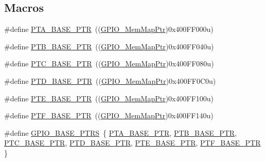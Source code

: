 \subsection*{Macros}
\begin{DoxyCompactItemize}
\item 
\#define \hyperlink{group___g_p_i_o___peripheral_gadf98f6ee2bbfd42102e378a66b29b9ef}{P\+T\+A\+\_\+\+B\+A\+S\+E\+\_\+\+P\+T\+R}~((\hyperlink{group___g_p_i_o___peripheral_ga31c1eddda45aa085f51142987e05ada5}{G\+P\+I\+O\+\_\+\+Mem\+Map\+Ptr})0x400\+F\+F000u)
\item 
\#define \hyperlink{group___g_p_i_o___peripheral_ga59ab0f28e891ea28f152505ce2021747}{P\+T\+B\+\_\+\+B\+A\+S\+E\+\_\+\+P\+T\+R}~((\hyperlink{group___g_p_i_o___peripheral_ga31c1eddda45aa085f51142987e05ada5}{G\+P\+I\+O\+\_\+\+Mem\+Map\+Ptr})0x400\+F\+F040u)
\item 
\#define \hyperlink{group___g_p_i_o___peripheral_gaaa3dc05c2a51a960067e1de6863fd3dd}{P\+T\+C\+\_\+\+B\+A\+S\+E\+\_\+\+P\+T\+R}~((\hyperlink{group___g_p_i_o___peripheral_ga31c1eddda45aa085f51142987e05ada5}{G\+P\+I\+O\+\_\+\+Mem\+Map\+Ptr})0x400\+F\+F080u)
\item 
\#define \hyperlink{group___g_p_i_o___peripheral_gaa61d2c33375f3becbae1353eee4c1317}{P\+T\+D\+\_\+\+B\+A\+S\+E\+\_\+\+P\+T\+R}~((\hyperlink{group___g_p_i_o___peripheral_ga31c1eddda45aa085f51142987e05ada5}{G\+P\+I\+O\+\_\+\+Mem\+Map\+Ptr})0x400\+F\+F0\+C0u)
\item 
\#define \hyperlink{group___g_p_i_o___peripheral_gaa230685f72ad1540850ab8d12366775c}{P\+T\+E\+\_\+\+B\+A\+S\+E\+\_\+\+P\+T\+R}~((\hyperlink{group___g_p_i_o___peripheral_ga31c1eddda45aa085f51142987e05ada5}{G\+P\+I\+O\+\_\+\+Mem\+Map\+Ptr})0x400\+F\+F100u)
\item 
\#define \hyperlink{group___g_p_i_o___peripheral_ga77d3c9297d0f81182ffcc68c0096eb1a}{P\+T\+F\+\_\+\+B\+A\+S\+E\+\_\+\+P\+T\+R}~((\hyperlink{group___g_p_i_o___peripheral_ga31c1eddda45aa085f51142987e05ada5}{G\+P\+I\+O\+\_\+\+Mem\+Map\+Ptr})0x400\+F\+F140u)
\item 
\#define \hyperlink{group___g_p_i_o___peripheral_gad0f7206167a584b1e75a81a5c30fa1c2}{G\+P\+I\+O\+\_\+\+B\+A\+S\+E\+\_\+\+P\+T\+R\+S}~\{ \hyperlink{group___g_p_i_o___peripheral_gadf98f6ee2bbfd42102e378a66b29b9ef}{P\+T\+A\+\_\+\+B\+A\+S\+E\+\_\+\+P\+T\+R}, \hyperlink{group___g_p_i_o___peripheral_ga59ab0f28e891ea28f152505ce2021747}{P\+T\+B\+\_\+\+B\+A\+S\+E\+\_\+\+P\+T\+R}, \hyperlink{group___g_p_i_o___peripheral_gaaa3dc05c2a51a960067e1de6863fd3dd}{P\+T\+C\+\_\+\+B\+A\+S\+E\+\_\+\+P\+T\+R}, \hyperlink{group___g_p_i_o___peripheral_gaa61d2c33375f3becbae1353eee4c1317}{P\+T\+D\+\_\+\+B\+A\+S\+E\+\_\+\+P\+T\+R}, \hyperlink{group___g_p_i_o___peripheral_gaa230685f72ad1540850ab8d12366775c}{P\+T\+E\+\_\+\+B\+A\+S\+E\+\_\+\+P\+T\+R}, \hyperlink{group___g_p_i_o___peripheral_ga77d3c9297d0f81182ffcc68c0096eb1a}{P\+T\+F\+\_\+\+B\+A\+S\+E\+\_\+\+P\+T\+R} \}
\end{DoxyCompactItemize}
